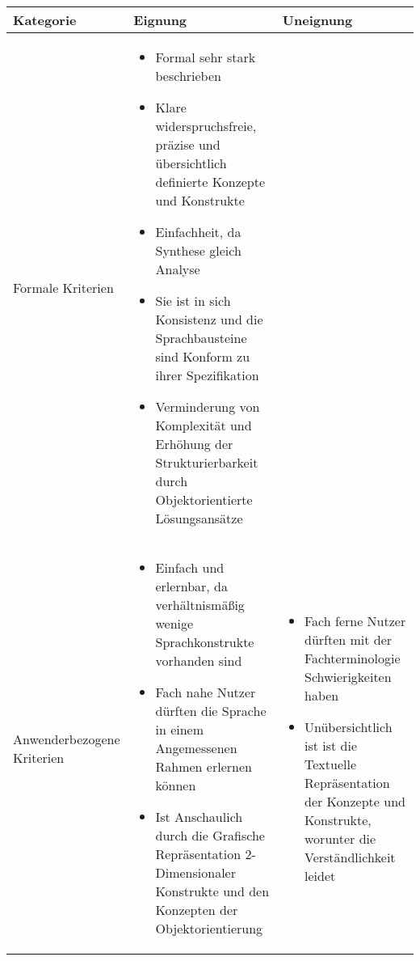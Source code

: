\begin{tabularx}{\textwidth}{|l|X|X|}
	\hline
	Kategorie & Eignung & Uneignung  \\
	\hline
	Formale Kriterien	&
	\begin{itemize}
		\item Formal sehr stark beschrieben
		\item Klare widerspruchsfreie, präzise und übersichtlich definierte Konzepte und Konstrukte
		\item Einfachheit, da Synthese gleich Analyse
		\item Sie ist in sich Konsistenz und die Sprachbausteine sind Konform zu ihrer Spezifikation
		\item Verminderung von Komplexität und Erhöhung der Strukturierbarkeit durch Objektorientierte Lösungsansätze
	\end{itemize} & \\
	\hline
	Anwenderbezogene Kriterien &
	\begin{itemize}
		\item Einfach und erlernbar, da verhältnismäßig wenige Sprachkonstrukte vorhanden sind
		\item Fach nahe Nutzer dürften die Sprache in einem Angemessenen Rahmen erlernen können
		\item Ist Anschaulich durch die Grafische Repräsentation 2-Dimensionaler Konstrukte und den Konzepten der Objektorientierung
		\end{itemize}  & 
	\begin{itemize}
		\item Fach ferne Nutzer dürften mit der Fachterminologie Schwierigkeiten haben
		\item Unübersichtlich ist ist die Textuelle Repräsentation der Konzepte und Konstrukte, worunter die Verständlichkeit leidet
	\end{itemize} \\
	\hline
\end{tabularx} 

